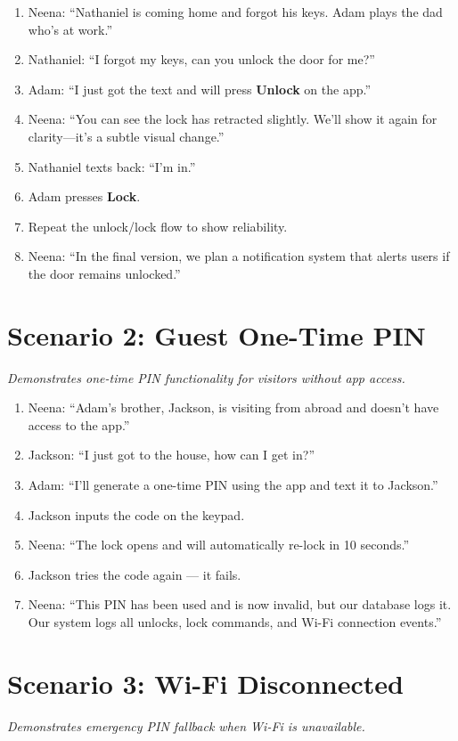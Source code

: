 \documentclass[12pt]{article}
\begin{document}
\begin{enumerate}[leftmargin=1.5em]
    \item Neena: “Nathaniel is coming home and forgot his keys. Adam plays the dad who’s at work.”
    \item Nathaniel: “I forgot my keys, can you unlock the door for me?”
    \item Adam: “I just got the text and will press \textbf{Unlock} on the app.”
    \item Neena: “You can see the lock has retracted slightly. We’ll show it again for clarity—it’s a subtle visual change.”
    \item Nathaniel texts back: “I’m in.”
    \item Adam presses \textbf{Lock}.
    \item Repeat the unlock/lock flow to show reliability.
    \item Neena: “In the final version, we plan a notification system that alerts users if the door remains unlocked.”
\end{enumerate}

\section{Scenario 2: Guest One-Time PIN}
\textit{Demonstrates one-time PIN functionality for visitors without app access.}

\begin{enumerate}
    \item Neena: “Adam’s brother, Jackson, is visiting from abroad and doesn’t have access to the app.”
    \item Jackson: “I just got to the house, how can I get in?”
    \item Adam: “I’ll generate a one-time PIN using the app and text it to Jackson.”
    \item Jackson inputs the code on the keypad.
    \item Neena: “The lock opens and will automatically re-lock in 10 seconds.”
    \item Jackson tries the code again — it fails.
    \item Neena: “This PIN has been used and is now invalid, but our database logs it. Our system logs all unlocks, lock commands, and Wi-Fi connection events.”
\end{enumerate}

\section{Scenario 3: Wi-Fi Disconnected}
\textit{Demonstrates emergency PIN fallback when Wi-Fi is unavailable.}
\end{document}
